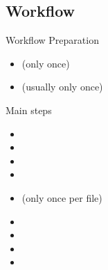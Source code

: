 \subsection{Workflow}
\begin{frame}{Workflow}
    \linuxframe
    Preparation
    \begin{itemize}
        \item {} (only once)
        \item {} (usually only once)
    \end{itemize}

    Main steps
    \begin{itemize}
        \item {}
        \item {}
        \item {}
        \item {}
        \item {} (only once per file)
        \item {}
        \item {}
        \item {}
        \item {}
    \end{itemize}
\end{frame}

